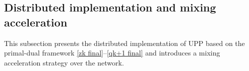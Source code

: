 \documentclass[12pt,draftcls,onecolumn]{IEEEtran}
\renewcommand{\Re}{{\mathbb{R}}}
\begin{document}


\subsection{Distributed implementation and mixing acceleration}

This subsection presents the distributed implementation of UPP based on the primal-dual framework \eqref{zk final}--\eqref{qk+1 final} and introduces a mixing acceleration strategy over the network.
\end{document}
